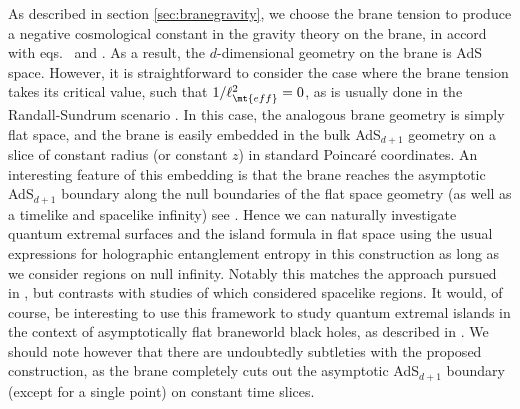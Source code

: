  As described in section \ref{sec:branegravity}, we choose the brane tension to produce a negative cosmological constant in the gravity theory on the brane, in accord with eqs.~ and . As a result, the $d$-dimensional geometry on the brane is AdS space. However, it is straightforward to consider the case where the brane tension takes its critical value, such that $1/\ell_\mt{eff}^2=0$, as is usually done in the Randall-Sundrum scenario \cite{Randall:1999ee,Randall:1999vf}. In this case, the analogous brane geometry is simply flat space, and the brane is easily embedded in the bulk AdS$_{d+1}$ geometry on a slice of constant radius (or constant $z$) in standard Poincar\'e coordinates. An interesting feature of this embedding is that the brane reaches the asymptotic AdS$_{d+1}$ boundary along the null boundaries of the flat space geometry (as well as a timelike and spacelike infinity) \eg see \cite{Karch:2001cw}. 
Hence we can naturally investigate quantum extremal surfaces and the island formula in flat space using the usual expressions for holographic entanglement entropy in this construction as long as we consider regions on null infinity. Notably this matches the approach pursued in \cite{Hartman:2020swn}, but contrasts with studies of \eg \cite{Gautason:2020tmk} which considered spacelike regions. It would, of course, be interesting to use this framework to study quantum extremal islands in the context of asymptotically flat braneworld black holes, \eg as described in \cite{Emparan:1999wa,Emparan:1999fd}. We should note however that there are undoubtedly subtleties with the proposed construction, \eg as the brane completely cuts out the asymptotic AdS$_{d+1}$ boundary (except for a single point) on constant time slices. 

